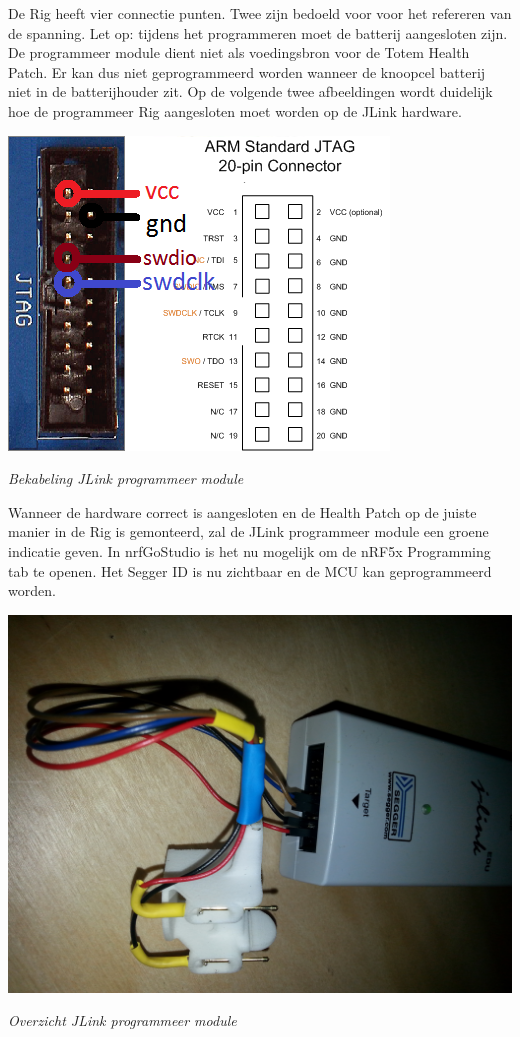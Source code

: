\documentclass[conference]{IEEEtran}
\begin{document}
De Rig heeft vier connectie punten. Twee zijn bedoeld voor voor het refereren van de spanning. Let op: tijdens het programmeren moet de batterij aangesloten zijn. De programmeer module dient niet als voedingsbron voor de Totem Health Patch. Er kan dus niet geprogrammeerd worden wanneer de knoopcel batterij niet in de batterijhouder zit. Op de volgende twee afbeeldingen wordt duidelijk hoe de programmeer Rig aangesloten moet worden op de JLink hardware.

\begin{center}
    \includegraphics[scale=1.2]{jlink}
    \begin{minipage}{0.6\textwidth}
    \footnotesize
    \emph{Bekabeling JLink programmeer module}
    \end{minipage}
\end{center}

\newpage

Wanneer de hardware correct is aangesloten en de Health Patch op de juiste manier in de Rig is gemonteerd, zal de JLink programmeer module een groene indicatie geven. In nrfGoStudio is het nu mogelijk om de nRF5x Programming tab te openen. Het Segger ID is nu zichtbaar en de MCU kan geprogrammeerd worden.

\begin{center}
    \includegraphics[scale=0.07]{jlink2}
    \begin{minipage}{0.6\textwidth}
    \footnotesize
    \emph{Overzicht JLink programmeer module}
    \end{minipage}
\end{center}
\end{document}
